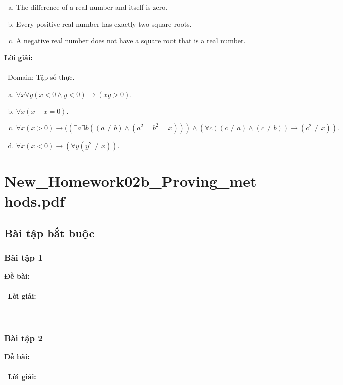 \documentclass[a4paper]{article}
\begin{document}
\begin{enumerate}
\begin{enumerate}[a)]
\item The difference of a real number and itself is zero.
\item Every positive real number has exactly two square
roots.
\item A negative real number does not have a square root
that is a real number.
\end{enumerate}
\textbf{Lời giải: } \\\ \\\
Domain: Tập số thực.
\begin{enumerate}[a)]
\item $\forall x \forall y(x < 0 \land y < 0) \rightarrow (xy > 0).$
\item $\forall x(x - x = 0).$
\item $\forall x (x>0)\rightarrow ((\exists a \exists b ((a \neq b) \land (a^2 = b^2 = x))) \land (\forall c ((c \neq a) \land (c \neq b))\rightarrow(c^2 \neq x)).$
\item $\forall x (x < 0) \rightarrow (\forall y (y^2 \neq x)).$
\end{enumerate}

\clearpage

\section{New\_Homework02b\_Proving\_methods.pdf}
\subsection{Bài tập bắt buộc}
\subsubsection{Bài tập 1}
\textbf{Đề bài:} 
\\\ \\\
\textbf{Lời giải:} \\\ \\\
\clearpage
\subsubsection{Bài tập 2}
\textbf{Đề bài:} 
\\\ \\\
\textbf{Lời giải:} \\\ \\\
\clearpage

\end{enumerate}
\end{document}
